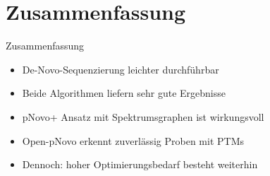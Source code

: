 \documentclass{beamer}
\newcommand{\highlightColor}{nDarkBlue!55!}
\begin{document}
    \section{Zusammenfassung}
    \begin{frame}{Zusammenfassung}
        \begin{itemize}
            \item<1-> De-Novo-Sequenzierung leichter durchführbar
            \item<1-> Beide Algorithmen liefern \textcolor{\highlightColor}{sehr gute} Ergebnisse
            \item<1-> pNovo+ Ansatz mit Spektrumsgraphen ist wirkungsvoll
            \item<1-> Open-pNovo erkennt zuverlässig Proben mit PTMs
            \vspace*{0.5cm}
            \item<2-> Dennoch: hoher Optimierungsbedarf besteht weiterhin
        \end{itemize}
    \end{frame}
\end{document}

